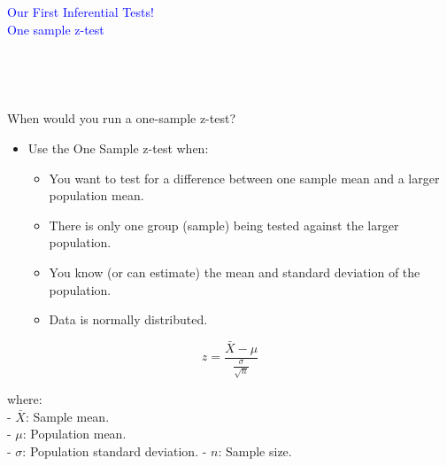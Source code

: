 \documentclass[
  ignorenonframetext,
]{beamer}
\providecommand{\tightlist}{%
  \setlength{\itemsep}{0pt}\setlength{\parskip}{0pt}}
\begin{document}
\begin{frame}{}
\label{section}
\vspace{2cm}
\centering

\textcolor{blue}{Our First Inferential Tests!\\
One sample z-test}\\
\strut \\
\strut \\
\end{frame}

\begin{frame}{When would you run a one-sample z-test?}
\label{when-would-you-run-a-one-sample-z-test}
\begin{itemize}
\tightlist
\item
  Use the One Sample z-test when:

  \begin{itemize}
  \tightlist
  \item
    You want to test for a difference between one sample mean and a
    larger population mean.
  \item
    There is only one group (sample) being tested against the larger
    population.
  \item
    You know (or can estimate) the mean and standard deviation of the
    population.
  \item
    Data is normally distributed.
  \end{itemize}
\end{itemize}

\[
z = \frac{\bar{X} - \mu}{\frac{\sigma}{\sqrt{n}}}
\]

where:\\
- \(\bar{X}\): Sample mean.\\
- \(\mu\): Population mean.\\
- \(\sigma\): Population standard deviation. - \(n\): Sample size.
\end{frame}
\end{document}

